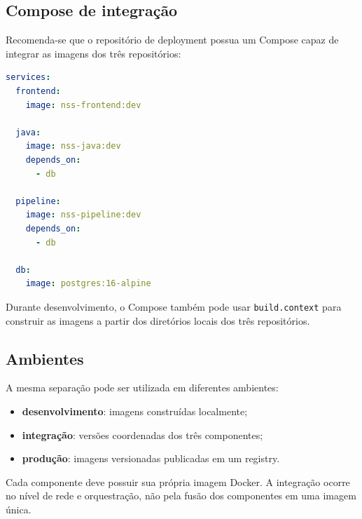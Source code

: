 \subsection{Compose de integração}

Recomenda-se que o repositório de deployment possua um Compose capaz de integrar as imagens dos três repositórios:

\begin{lstlisting}[language=YAML]
services:
  frontend:
    image: nss-frontend:dev

  java:
    image: nss-java:dev
    depends_on:
      - db

  pipeline:
    image: nss-pipeline:dev
    depends_on:
      - db

  db:
    image: postgres:16-alpine
\end{lstlisting}

Durante desenvolvimento, o Compose também pode usar \texttt{build.context} para construir as imagens a partir dos diretórios locais dos três repositórios.

\subsection{Ambientes}

A mesma separação pode ser utilizada em diferentes ambientes:

\begin{itemize}
    \item \textbf{desenvolvimento}: imagens construídas localmente;
    \item \textbf{integração}: versões coordenadas dos três componentes;
    \item \textbf{produção}: imagens versionadas publicadas em um registry.
\end{itemize}

\begin{regra}
Cada componente deve possuir sua própria imagem Docker. A integração ocorre no nível de rede e orquestração, não pela fusão dos componentes em uma imagem única.
\end{regra}
